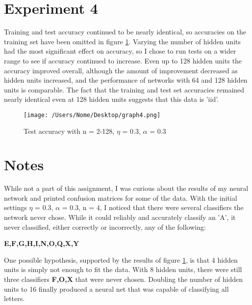 \documentclass[10pt,letterpaper,notitlepage]{article}
\begin{document}
	\section*{Experiment 4}
	Training and test accuracy continued to be nearly identical, so accuracies on the training set have been omitted in figure \ref{exp4}. Varying the number of hidden units had the most significant effect on accuracy, so I chose to run tests on a wider range to see if accuracy continued to increase. Even up to 128 hidden units the accuracy improved overall, although the amount of improvement decreased as hidden units increased, and the performance of networks with 64 and 128 hidden units is comparable. The fact that the training and test set accuracies remained nearly identical even at 128 hidden units suggests that this data is 'iid'. 
	\begin{figure}[!htb]
		\texttt{[image: /Users/Nome/Desktop/graph4.png]}
		\caption{Test accuracy with n = 2-128, $\eta$ = 0.3, $\alpha$ = 0.3}
		\label{exp4}
	\end{figure}
	\section*{Notes}
	While not a part of this assignment, I was curious about the results of my neural network and printed confusion matrices for some of the data. With the initial settings $\eta$ = 0.3, $\alpha$ = 0.3, n = 4, I noticed that there were several classifiers the network never chose. While it could reliably and accurately classify an 'A', it never classified, either correctly or incorrectly, any of the following:
	\begin{center}
		\textbf{E,F,G,H,I,N,O,Q,X,Y}
	\end{center}
	One possible hypothesis, supported by the results of figure \ref{exp4}, is that 4 hidden units is simply not enough to fit the data. With 8 hidden units, there were still three classifiers \textbf{F,O,X} that were never chosen. Doubling the number of hidden units to 16 finally produced a neural net that was capable of classifying all letters.
	
\end{document}
